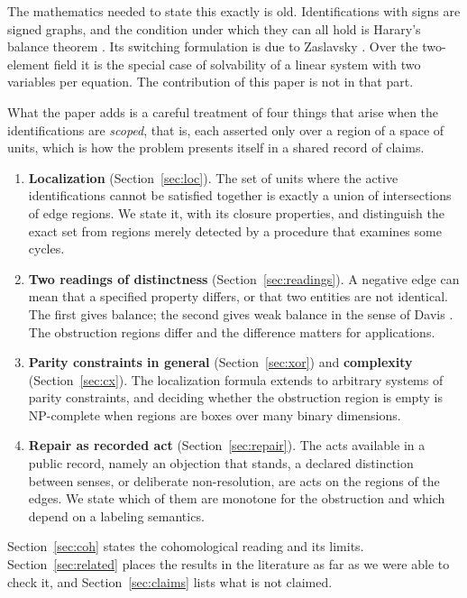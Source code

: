 \documentclass[11pt]{article}
\theoremstyle{plain}
\theoremstyle{definition}
\theoremstyle{remark}
\begin{document}
The mathematics needed to state this exactly is old. Identifications with signs are signed graphs, and the condition under which they can all hold is Harary's balance theorem \cite{harary1953}. Its switching formulation is due to Zaslavsky \cite{zaslavsky1982}. Over the two-element field it is the special case of solvability of a linear system with two variables per equation. The contribution of this paper is not in that part.

What the paper adds is a careful treatment of four things that arise when the identifications are \emph{scoped}, that is, each asserted only over a region of a space of units, which is how the problem presents itself in a shared record of claims.
\begin{enumerate}[label=(\arabic*)]
\item \textbf{Localization} (Section~\ref{sec:loc}). The set of units where the active identifications cannot be satisfied together is exactly a union of intersections of edge regions. We state it, with its closure properties, and distinguish the exact set from regions merely detected by a procedure that examines some cycles.
\item \textbf{Two readings of distinctness} (Section~\ref{sec:readings}). A negative edge can mean that a specified property differs, or that two entities are not identical. The first gives balance; the second gives weak balance in the sense of Davis \cite{davis1967}. The obstruction regions differ and the difference matters for applications.
\item \textbf{Parity constraints in general} (Section~\ref{sec:xor}) and \textbf{complexity} (Section~\ref{sec:cx}). The localization formula extends to arbitrary systems of parity constraints, and deciding whether the obstruction region is empty is NP-complete when regions are boxes over many binary dimensions.
\item \textbf{Repair as recorded act} (Section~\ref{sec:repair}). The acts available in a public record, namely an objection that stands, a declared distinction between senses, or deliberate non-resolution, are acts on the regions of the edges. We state which of them are monotone for the obstruction and which depend on a labeling semantics.
\end{enumerate}
Section~\ref{sec:coh} states the cohomological reading and its limits. Section~\ref{sec:related} places the results in the literature as far as we were able to check it, and Section~\ref{sec:claims} lists what is not claimed.
\end{document}
